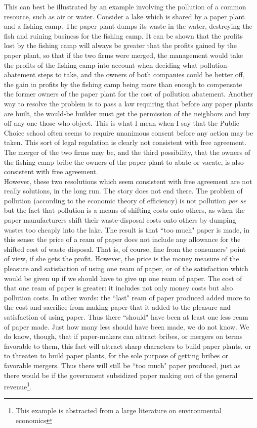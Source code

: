 This can best be illustrated by an example involving the pollution of a common resource, such as air or water. Consider a lake which is shared by a paper plant and a fishing camp. The paper plant dumps its waste in the water, destroying the fish and ruining business for the fishing camp. It can be shown that the profits lost by the fishing camp will always be greater that the profits gained by the paper plant, so that if the two firms were merged, the management would take the profits of the fishing camp into account when deciding what pollution-abatement steps to take, and the owners of both companies could be better off, the gain in profits by the fishing camp being more than enough to compensate the former owners of the paper plant for the cost of pollution abatement. Another way to resolve the problem is to pass a law requiring that before any paper plants are built, the would-be builder must get the permission of the neighbors and buy off any one those who object. This is what I mean when I say that the Public Choice school often seems to require unanimous consent before any action may be taken. This sort of legal regulation is clearly not consistent with free agreement. The merger of the two firms may be, and the third possibility, that the owners of the fishing camp bribe the owners of the paper plant to abate or vacate, is also consistent with free agreement.\\
However, these two resolutions which seem consistent with free agreement are not really solutions, in the long run. The story does not end there. The problem of pollution (according to the economic theory of efficiency) is not pollution \emph{per se} but the fact that pollution is a means of shifting costs onto others, as when the paper manufacturers shift their waste-disposal costs onto others by dumping wastes too cheaply into the lake. The result is that ``too much" paper is made, in this sense: the price of a ream of paper does not include any allowance for the shifted cost of waste disposal. That is, of course, fine from the consumers' point of view, if she gets the profit. However, the price is the money measure of the pleasure and satisfaction of using one ream of paper, or of the satisfaction which would be given up if we should have to give up one ream of paper. The cost of that one ream of paper is greater: it includes not only money costs but also pollution costs. In other words: the ``last" ream of paper produced added more to the cost and sacrifice from making paper that it added to the pleasure and satisfaction of using paper. Thus there ``should" have been at least one less ream of paper made. Just how many less should have been made, we do not know. We do know, though, that if paper-makers can attract bribes, or mergers on terms favorable to them, this fact will attract sharp characters to build paper plants, or to threaten to build paper plants, for the sole purpose of getting bribes or favorable mergers. Thus there will still be ``too much" paper produced, just as there would be if the government subsidized paper making out of the general revenue\footnote{This example is abstracted from a large literature on environmental economics}.\\
